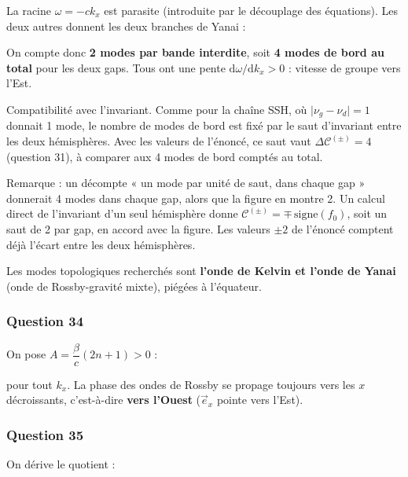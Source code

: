 \documentclass[11pt,a4paper]{article}
\newcommand{\equationajustee}[1]{%
  \sbox{\boiteequation}{$\displaystyle #1$}%
  \ifdim\wd\boiteequation>\linewidth
    \[\resizebox{\linewidth}{!}{\usebox{\boiteequation}}\]%
  \else
    \[#1\]%
  \fi}
\begin{document}
\equationajustee{(\omega+ck_x)\left(\omega^2-ck_x\omega-\beta c\right)=0}

La racine \(\omega=-ck_x\) est parasite (introduite par le découplage des équations). Les deux autres donnent les deux branches de Yanai :

\equationajustee{\omega=\frac12\left(ck_x\pm\sqrt{c^2k_x^2+4\beta c}\right)}

On compte donc \textbf{2 modes par bande interdite}, soit \textbf{4 modes de bord au total} pour les deux gaps. Tous ont une pente \(\mathrm d\omega/\mathrm dk_x>0\) : vitesse de groupe vers l'Est.

Compatibilité avec l'invariant. Comme pour la chaîne SSH, où \(\lvert\nu_g-\nu_d\rvert=1\) donnait 1 mode, le nombre de modes de bord est fixé par le saut d'invariant entre les deux hémisphères. Avec les valeurs de l'énoncé, ce saut vaut \(\Delta\mathscr C^{(\pm)}=4\) (question 31), à comparer aux 4 modes de bord comptés au total.

Remarque : un décompte « un mode par unité de saut, dans chaque gap » donnerait 4 modes dans chaque gap, alors que la figure en montre 2. Un calcul direct de l'invariant d'un seul hémisphère donne \(\mathscr C^{(\pm)}=\mp\,\mathrm{signe}(f_0)\), soit un saut de 2 par gap, en accord avec la figure. Les valeurs \(\pm2\) de l'énoncé comptent déjà l'écart entre les deux hémisphères.

Les modes topologiques recherchés sont \textbf{l'onde de Kelvin et l'onde de Yanai} (onde de Rossby-gravité mixte), piégées à l'équateur.

\hypertarget{question-34}{%
\subsubsection{Question 34}\label{question-34}}

On pose \(A=\dfrac{\beta}{c}(2n+1)>0\) :

\equationajustee{\boxed{v_\varphi=\frac{\omega}{k_x}=-\frac{\beta}{k_x^2+A}<0}}

pour tout \(k_x\). La phase des ondes de Rossby se propage toujours vers les \(x\) décroissants, c'est-à-dire \textbf{vers l'Ouest} (\(\vec e_x\) pointe vers l'Est).

\hypertarget{question-35}{%
\subsubsection{Question 35}\label{question-35}}

On dérive le quotient :
\end{document}
